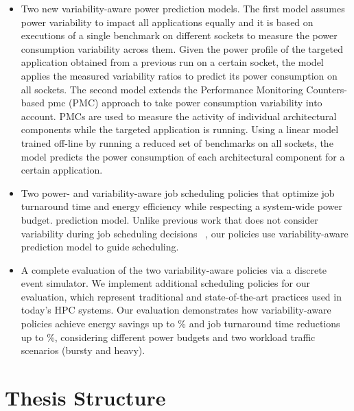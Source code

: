 \begin{itemize} 

	\item Two new variability-aware power prediction models.  The first model assumes power
variability to impact all applications equally and it is based on executions of a single
benchmark on different sockets to measure the power consumption variability across them.
Given the power profile of the targeted application obtained from a previous run on a
certain socket, the model applies the measured variability ratios to predict its power
consumption on all sockets.  The second model extends the Performance Monitoring
Counters-based \acrlong{pmc} (PMC) approach to take power consumption variability into
account.  PMCs are used to measure the activity of individual architectural components
while the targeted application is running. Using a linear model trained off-line by
running a reduced set of benchmarks on all sockets, the model predicts the power
consumption of each architectural component for a certain application.  

	\item Two power- and variability-aware job scheduling policies that optimize job turnaround 
time and energy efficiency while respecting a system-wide power budget.  prediction model.
Unlike previous work that does not consider variability during job scheduling decisions
~\cite{Inadomi:2015:AMI:2807591.2807638,Teodorescu:2008:VAS:1381306.1382152,Ellsworth:2015:DPS:2807591.2807643,Gholkar:2016:PTH:2967938.2967961},
our policies use variability-aware prediction model to guide scheduling.

	\item A complete evaluation of the two variability-aware policies via a discrete event 
simulator.  We implement additional scheduling policies for our evaluation, which
represent traditional and state-of-the-art practices used in today's HPC systems.  Our
evaluation demonstrates how variability-aware policies achieve energy savings up to
\MaxEnergy\% and job turnaround time reductions up to \MaxJTT\%, considering different
power budgets and two workload traffic scenarios (bursty and heavy).

\end{itemize}    	



\section{Thesis Structure}


